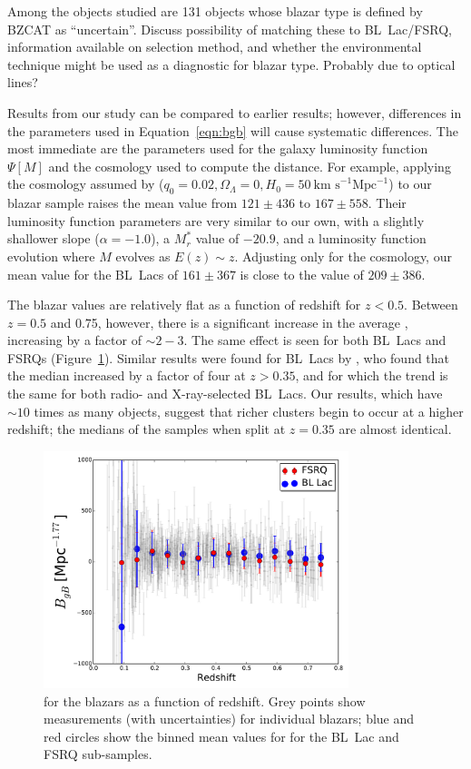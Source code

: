 \documentclass{emulateapj}
\begin{document}
Among the objects studied are 131 objects whose blazar type is defined by BZCAT as ``uncertain''. Discuss possibility of matching these to BL~Lac/FSRQ, information available on selection method, and whether the environmental technique might be used as a diagnostic for blazar type. Probably due to optical lines?

Results from our study can be compared to earlier results; however, differences in the parameters used in Equation~\ref{eqn:bgb} will cause systematic differences. The most immediate are the parameters used for the galaxy luminosity function $\Psi[M]$ and the cosmology used to compute the distance. For example, applying the cosmology assumed by \citet{wur97} ($q_0=0.02, \Omega_\Lambda=0, H_0=50~\mbox{km s}^{-1}\mbox{Mpc}^{-1}$) to our blazar sample raises the mean \bgb{} value from $121\pm436$ to $167\pm558$. Their luminosity function parameters are very similar to our own, with a slightly shallower slope ($\alpha=-1.0$), a $M_r^*$ value of $-20.9$, and a luminosity function evolution where $M$ evolves as $E(z)\sim z$. Adjusting only for the cosmology, our mean value for the BL~Lacs of $161\pm367$ is close to the \citet{wur97} value of $209\pm386$. 

The blazar \bgb{} values are relatively flat as a function of redshift for $z<0.5$. Between $z=0.5$ and 0.75, however, there is a significant increase in the average \bgb, increasing by a factor of $\sim2-3$. The same effect is seen for both BL~Lacs and FSRQs (Figure~\ref{fig:bgb_redshift}). Similar results were found for BL~Lacs by \citet{wur97}, who found that the median \bgb{} increased by a factor of four at $z>0.35$, and for which the trend is the same for both radio- and X-ray-selected BL~Lacs. Our results, which have $\sim10$ times as many objects, suggest that richer clusters begin to occur at a higher redshift; the medians of the samples when split at $z=0.35$ are almost identical. 

\begin{figure}
\includegraphics[width=3.5in]{figures/bgb_redshift.pdf}
\caption{\bgb{} for the blazars as a function of redshift. Grey points show measurements (with uncertainties) for individual blazars; blue and red circles show the binned mean values for \bgb{} for the BL~Lac and FSRQ sub-samples. 
\label{fig:bgb_redshift}}
\end{figure}
\end{document}
